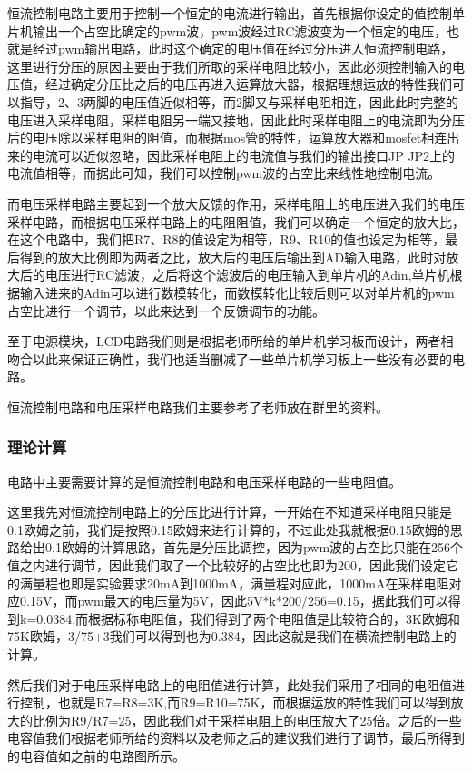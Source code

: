 \documentclass{../source/zjureport}
\begin{document}
        恒流控制电路主要用于控制一个恒定的电流进行输出，首先根据你设定的值控制单片机输出一个占空比确定的pwm波，pwm波经过RC滤波变为一个恒定的电压，也就是经过pwm输出电路，此时这个确定的电压值在经过分压进入恒流控制电路，这里进行分压的原因主要由于我们所取的采样电阻比较小，因此必须控制输入的电压值，经过确定分压比之后的电压再进入运算放大器，根据理想运放的特性我们可以指导，2、3两脚的电压值近似相等，而2脚又与采样电阻相连，因此此时完整的电压进入采样电阻，采样电阻另一端又接地，因此此时采样电阻上的电流即为分压后的电压除以采样电阻的阻值，而根据mos管的特性，运算放大器和mosfet相连出来的电流可以近似忽略，因此采样电阻上的电流值与我们的输出接口JP JP2上的电流值相等，而据此可知，我们可以控制pwm波的占空比来线性地控制电流。

        而电压采样电路主要起到一个放大反馈的作用，采样电阻上的电压进入我们的电压采样电路，而根据电压采样电路上的电阻阻值，我们可以确定一个恒定的放大比，在这个电路中，我们把R7、R8的值设定为相等，R9、R10的值也设定为相等，最后得到的放大比例即为两者之比，放大后的电压后输出到AD输入电路，此时对放大后的电压进行RC滤波，之后将这个滤波后的电压输入到单片机的Adin,单片机根据输入进来的Adin可以进行数模转化，而数模转化比较后则可以对单片机的pwm占空比进行一个调节，以此来达到一个反馈调节的功能。

        至于电源模块，LCD电路我们则是根据老师所给的单片机学习板而设计，两者相吻合以此来保证正确性，我们也适当删减了一些单片机学习板上一些没有必要的电路。

        恒流控制电路和电压采样电路我们主要参考了老师放在群里的资料。

        \subsubsection{理论计算}
        电路中主要需要计算的是恒流控制电路和电压采样电路的一些电阻值。
   
        这里我先对恒流控制电路上的分压比进行计算，一开始在不知道采样电阻只能是0.1欧姆之前，我们是按照0.15欧姆来进行计算的，不过此处我就根据0.15欧姆的思路给出0.1欧姆的计算思路，首先是分压比调控，因为pwm波的占空比只能在256个值之内进行调节，因此我们取了一个比较好的占空比也即为200，因此我们设定它的满量程也即是实验要求20mA到1000mA，满量程对应此，1000mA在采样电阻对应0.15V，而pwm最大的电压量为5V，因此5V*k*200/256=0.15，据此我们可以得到k=0.0384,而根据标称电阻值，我们得到了两个电阻值是比较符合的，3K欧姆和75K欧姆，3/75+3我们可以得到也为0.384，因此这就是我们在横流控制电路上的计算。
  
        然后我们对于电压采样电路上的电阻值进行计算，此处我们采用了相同的电阻值进行控制，也就是R7=R8=3K,而R9=R10=75K，而根据运放的特性我们可以得到放大的比例为R9/R7=25，因此我们对于采样电阻上的电压放大了25倍。之后的一些电容值我们根据老师所给的资料以及老师之后的建议我们进行了调节，最后所得到的电容值如之前的电路图所示。
  
\end{document}
